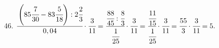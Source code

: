 46. $\cfrac{\left(85\cfrac{7}{30}-83\cfrac{5}{18}\right):2\cfrac{2}{3}}{0,04}\cdot\cfrac{3}{11}=
\cfrac{\cfrac{88}{45}:\cfrac{8}{3}}{\cfrac{1}{25}}\cdot\cfrac{3}{11}=\cfrac{\cfrac{11}{15}}{\cfrac{1}{25}}\cdot\cfrac{3}{11}=
\cfrac{55}{3}\cdot\cfrac{3}{11}=5.$\\
